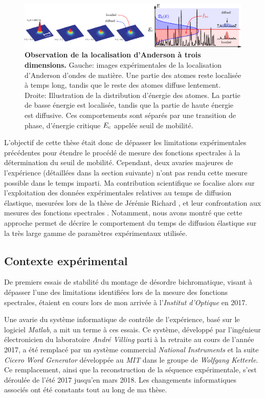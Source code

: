 \begin{figure}
\centering
\includegraphics[width=\textwidth]{Fig/Introduction/AL3D.pdf}
\caption{\textbf{Observation de la localisation d'Anderson à trois dimensions.} Gauche: images expérimentales de la localisation d'Anderson d'ondes de matière. Une partie des atomes reste localisée à temps long, tandis que le reste des atomes diffuse lentement. Droite: Illustration de la distribution d'énergie des atomes. La partie de basse énergie est localisée, tandis que la partie de haute énergie est diffusive. Ces comportements sont séparés par une transition de phase, d'énergie critique $E_{\mathrm{c}}$ appelée seuil de mobilité.}
\label{fig:AL3D}
\end{figure}

L'objectif de cette thèse était donc de dépasser les limitations expérimentales précédentes pour étendre le procédé de mesure des fonctions spectrales à la détermination du seuil de mobilité. Cependant, deux avaries majeures de l'expérience (détaillées dans la section suivante) n'ont pas rendu cette mesure possible dans le temps imparti. Ma contribution scientifique se focalise alors sur l'exploitation des données expérimentales relatives au temps de diffusion élastique, mesurées lors de la thèse de Jérémie Richard \citep{richard2015propagation}\citep{richard2019elastic}, et leur confrontation aux mesures des fonctions spectrales \citep{signoles2019ultracold}. Notamment, nous avons montré que cette approche permet de décrire le comportement du temps de diffusion élastique sur la très large gamme de paramètres expérimentaux utilisée.






\subsection{Contexte expérimental}
De premiers essais de stabilité du montage de désordre bichromatique, visant à dépasser l'une des limitations identifiées lors de la mesure des fonctions spectrales, étaient en cours lors de mon arrivée à l'\emph{Institut d'Optique} en 2017.

Une avarie du système informatique de contrôle de l'expérience, basé sur le logiciel \emph{Matlab}, a mit un terme à ces essais. Ce système, développé par l'ingénieur électronicien du laboratoire \emph{André Villing} parti à la retraite au cours de l'année 2017, a été remplacé par un système commercial \emph{National Instruments} et la suite \emph{Cicero Word Generator} développée au \emph{MIT} dans le groupe de \emph{Wolfgang Ketterle}. Ce remplacement, ainsi que la reconstruction de la séquence expérimentale, s'est déroulée de l'été 2017 jusqu'en mars 2018. Les changements informatiques associés ont été constants tout au long de ma thèse.

